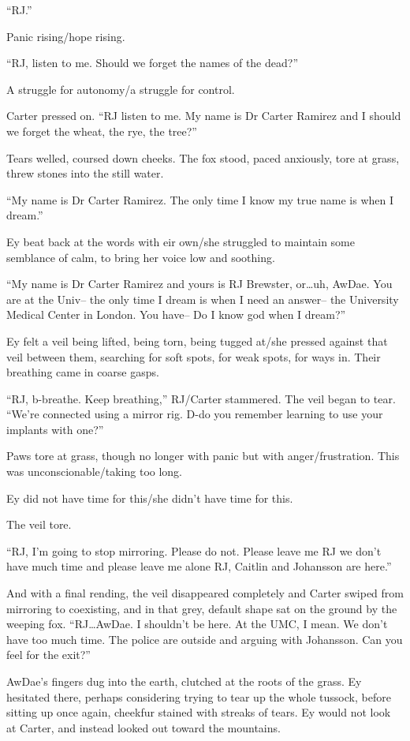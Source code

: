 ``RJ.''

Panic rising/hope rising.

``RJ, listen to me. Should we forget the names of the dead?''

A struggle for autonomy/a struggle for control.

Carter pressed on. ``RJ listen to me. My name is Dr Carter Ramirez and I should we forget the wheat, the rye, the tree?''

Tears welled, coursed down cheeks. The fox stood, paced anxiously, tore at grass, threw stones into the still water.

``My name is Dr Carter Ramirez. The only time I know my true name is when I dream.''

Ey beat back at the words with eir own/she struggled to maintain some semblance of calm, to bring her voice low and soothing.

``My name is Dr Carter Ramirez and yours is RJ Brewster, or\ldots{}uh, AwDae. You are at the Univ-- the only time I dream is when I need an answer-- the University Medical Center in London. You have-- Do I know god when I dream?''

Ey felt a veil being lifted, being torn, being tugged at/she pressed against that veil between them, searching for soft spots, for weak spots, for ways in. Their breathing came in coarse gasps.

``RJ, b-breathe. Keep breathing,'' RJ/Carter stammered. The veil began to tear. ``We're connected using a mirror rig. D-do you remember learning to use your implants with one?''

Paws tore at grass, though no longer with panic but with anger/frustration. This was unconscionable/taking too long.

Ey did not have time for this/she didn't have time for this.

The veil tore.

``RJ, I'm going to stop mirroring. Please do not. Please leave me RJ we don't have much time and please leave me alone RJ, Caitlin and Johansson are here.''

And with a final rending, the veil disappeared completely and Carter swiped from mirroring to coexisting, and in that grey, default shape sat on the ground by the weeping fox. ``RJ\ldots{}AwDae. I shouldn't be here. At the UMC, I mean. We don't have too much time. The police are outside and arguing with Johansson. Can you feel for the exit?''

AwDae's fingers dug into the earth, clutched at the roots of the grass. Ey hesitated there, perhaps considering trying to tear up the whole tussock, before sitting up once again, cheekfur stained with streaks of tears. Ey would not look at Carter, and instead looked out toward the mountains.

